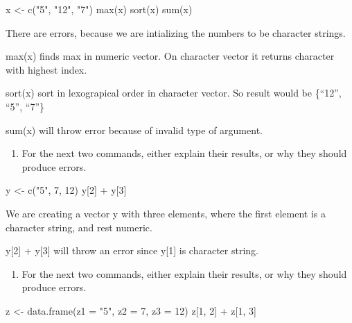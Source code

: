 \documentclass[
]{article}
\newenvironment{Shaded}{\begin{snugshade}}{\end{snugshade}}
\newcommand{\AttributeTok}[1]{\textcolor[rgb]{0.77,0.63,0.00}{#1}}
\newcommand{\DecValTok}[1]{\textcolor[rgb]{0.00,0.00,0.81}{#1}}
\newcommand{\FunctionTok}[1]{\textcolor[rgb]{0.00,0.00,0.00}{#1}}
\newcommand{\NormalTok}[1]{#1}
\newcommand{\OtherTok}[1]{\textcolor[rgb]{0.56,0.35,0.01}{#1}}
\newcommand{\SpecialCharTok}[1]{\textcolor[rgb]{0.00,0.00,0.00}{#1}}
\newcommand{\StringTok}[1]{\textcolor[rgb]{0.31,0.60,0.02}{#1}}
\providecommand{\tightlist}{%
  \setlength{\itemsep}{0pt}\setlength{\parskip}{0pt}}
\begin{document}
\begin{Shaded}
\begin{Highlighting}[]
\NormalTok{x }\OtherTok{\textless{}{-}} \FunctionTok{c}\NormalTok{(}\StringTok{"5"}\NormalTok{, }\StringTok{"12"}\NormalTok{, }\StringTok{"7"}\NormalTok{)}
\FunctionTok{max}\NormalTok{(x)}
\FunctionTok{sort}\NormalTok{(x)}
\FunctionTok{sum}\NormalTok{(x)}
\end{Highlighting}
\end{Shaded}

There are errors, because we are intializing the numbers to be character
strings.

max(x) finds max in numeric vector. On character vector it returns
character with highest index.

sort(x) sort in lexograpical order in character vector. So result would
be \{``12'', ``5'', ``7''\}

sum(x) will throw error because of invalid type of argument.

\begin{enumerate}
\def\labelenumi{\alph{enumi}.}
\setcounter{enumi}{1}
\tightlist
\item
  For the next two commands, either explain their results, or why they
  should produce errors.
\end{enumerate}

\begin{Shaded}
\begin{Highlighting}[]
\NormalTok{y }\OtherTok{\textless{}{-}} \FunctionTok{c}\NormalTok{(}\StringTok{"5"}\NormalTok{, }\DecValTok{7}\NormalTok{, }\DecValTok{12}\NormalTok{)}
\NormalTok{y[}\DecValTok{2}\NormalTok{] }\SpecialCharTok{+}\NormalTok{ y[}\DecValTok{3}\NormalTok{]}
\end{Highlighting}
\end{Shaded}

We are creating a vector y with three elements, where the first element
is a character string, and rest numeric.

y{[}2{]} + y{[}3{]} will throw an error since y{[}1{]} is character
string.

\begin{enumerate}
\def\labelenumi{\alph{enumi}.}
\setcounter{enumi}{2}
\tightlist
\item
  For the next two commands, either explain their results, or why they
  should produce errors.
\end{enumerate}

\begin{Shaded}
\begin{Highlighting}[]
\NormalTok{z }\OtherTok{\textless{}{-}} \FunctionTok{data.frame}\NormalTok{(}\AttributeTok{z1 =} \StringTok{"5"}\NormalTok{, }\AttributeTok{z2 =} \DecValTok{7}\NormalTok{, }\AttributeTok{z3 =} \DecValTok{12}\NormalTok{)}
\NormalTok{z[}\DecValTok{1}\NormalTok{, }\DecValTok{2}\NormalTok{] }\SpecialCharTok{+}\NormalTok{ z[}\DecValTok{1}\NormalTok{, }\DecValTok{3}\NormalTok{]}
\end{Highlighting}
\end{Shaded}
\end{document}
